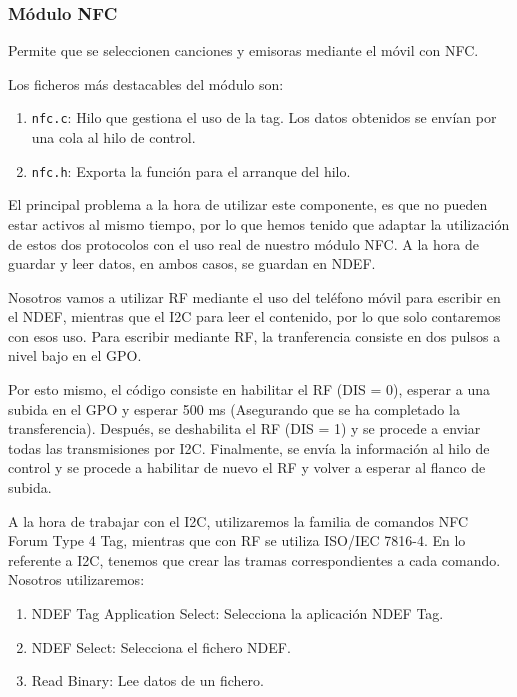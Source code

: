 \subsubsection{Módulo NFC}

Permite que se seleccionen canciones y emisoras mediante el móvil con NFC.


Los ficheros más destacables del módulo son:

\begin{enumerate}
	\item \texttt{nfc.c}: Hilo que gestiona el uso de la tag. Los datos obtenidos se envían por una cola al hilo de control.
	\item \texttt{nfc.h}: Exporta la función para el arranque del hilo.
\end{enumerate}

El principal problema a la hora de utilizar este componente, es que no pueden estar activos al mismo tiempo, por lo que hemos tenido que adaptar la utilización de estos dos protocolos con el uso real de nuestro módulo NFC. A la hora de guardar y leer datos, en ambos casos, se guardan en NDEF. 

Nosotros vamos a utilizar RF mediante el uso del teléfono móvil para escribir en el NDEF, mientras que el I2C para leer el contenido, por lo que solo contaremos con esos uso. Para escribir mediante RF, la tranferencia consiste en dos pulsos a nivel bajo en el GPO. 

Por esto mismo, el código consiste en habilitar el RF (DIS = 0), esperar a una subida en el GPO y esperar 500 ms (Asegurando que se ha completado la transferencia). Después, se deshabilita el RF (DIS = 1) y se procede a enviar todas las transmisiones por I2C. Finalmente, se envía la información al hilo de control y se procede a habilitar de nuevo el RF y volver a esperar al flanco de subida.

A la hora de trabajar con el I2C, utilizaremos la familia de comandos NFC Forum Type 4 Tag, mientras que con RF se utiliza ISO/IEC 7816-4. En lo referente a I2C, tenemos que crear las tramas correspondientes a cada comando. Nosotros utilizaremos:

\begin{enumerate}
\item NDEF Tag Application Select: Selecciona la aplicación NDEF Tag.
\item NDEF Select: Selecciona el fichero NDEF.
\item Read Binary: Lee datos de un fichero.
\end{enumerate}

